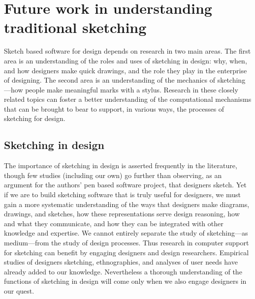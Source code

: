\section{Future work in understanding traditional sketching}
\label{sec:summary-three-areas}

Sketch based software for design depends on research in two main
areas. The first area is an understanding of the roles and uses of
sketching in design: why, when, and how designers make quick drawings,
and the role they play in the enterprise of designing. The second area
is an understanding of the mechanics of sketching---how people make
meaningful marks with a stylus. Research in these closely related
topics can foster a better understanding of the computational
mechanisms that can be brought to bear to support, in various ways,
the processes of sketching for design.

\subsection{Sketching in design}
The importance of sketching in design is asserted frequently in the
literature, though few studies (including our own) go further than
observing, as an argument for the authors' pen based software project,
that designers sketch. Yet if we are to build sketching software that
is truly useful for designers, we must gain a more systematic
understanding of the ways that designers make diagrams, drawings, and
sketches, how these representations serve design reasoning, how and
what they communicate, and how they can be integrated with other
knowledge and expertise. We cannot entirely separate the study of
sketching---as medium---from the study of design processes. Thus
research in computer support for sketching can benefit by engaging
designers and design researchers. Empirical studies of designers
sketching, ethnographies, and analyses of user needs have already
added to our knowledge. Nevertheless a thorough understanding of the
functions of sketching in design will come only when we also engage
designers in our quest.

